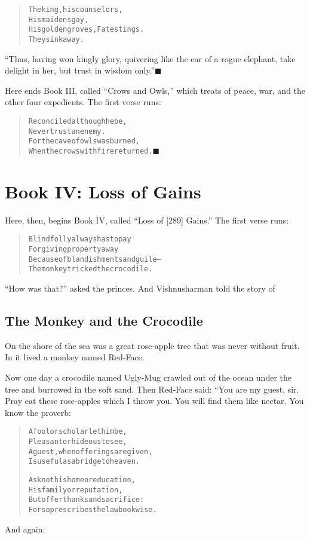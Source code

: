 \documentclass[article, twoside, 14pt]{memoir}
\newcommand{\qed}{\hfill \ensuremath{\blacksquare}}
\renewenvironment{verbatim}{%
\begin{quote}%
\vskip -10pt%
\begin{alltt}\normalfont\large}{\end{alltt}%
\end{quote}%
\vskip -10pt
} %
\begin{document}
\begin{verbatim}
The king, his counselors,
    His maidens gay,
His golden groves, Fate stings.
    They sink away.
\end{verbatim}
``Thus, having won kingly glory, quivering like the ear of a rogue elephant, take delight in her, but trust in wisdom only.''\hyperref[s47]{\qed}

Here ends Book III, called ``Crows and Owls,'' which treats of
peace, war, and the other four expedients. The first verse runs:

\begin{verbatim}
Reconciled although he be,
Never trust an enemy.
For the cave of owls was burned,
When the crows with fire returned.\hyperref[s46]{\qed}
\end{verbatim}
\section{Book IV: Loss of Gains}

\label{s65}

Here, then, begins Book IV, called ``Loss of [289] Gains.'' The
first verse runs:

\begin{verbatim}
Blind folly always has to pay
For giving property away
Because of blandishments and guile--
The monkey tricked the crocodile.
\end{verbatim}
``How was that?'' asked the princes. And Vishnusharman told the
story of

\subsection{The Monkey and the Crocodile}

\label{s66}

On the shore of the sea was a great rose-apple tree that was never
without fruit. In it lived a monkey named Red-Face.

Now one day a crocodile named Ugly-Mug crawled out of the ocean
under the tree and burrowed in the soft sand. Then Red-Face said:
“You are my guest, sir. Pray eat these rose-apples which I throw
you. You will find them like nectar. You know the proverb:

\begin{verbatim}
A fool or scholar let him be,
Pleasant or hideous to see,
A guest, when offerings are given,
Is useful as a bridge to heaven.

Ask not his home or education,
His family or reputation,
But offer thanks and sacrifice:
For so prescribes the lawbook wise.
\end{verbatim}
And again:
\end{document}
